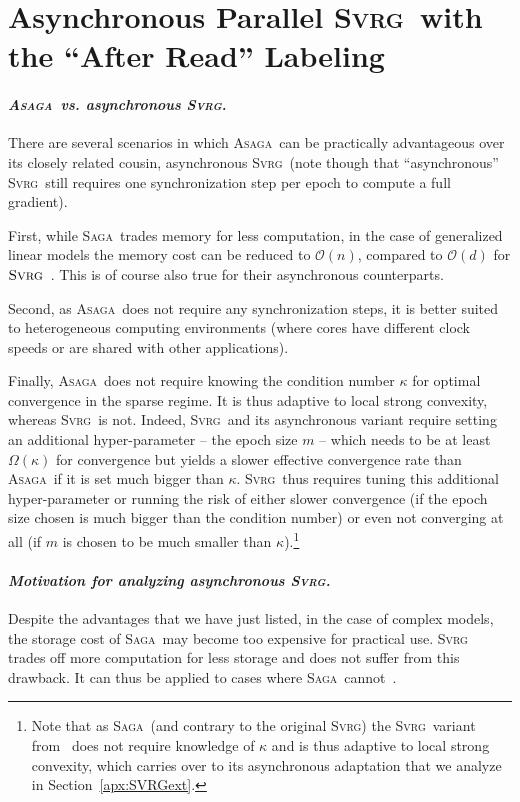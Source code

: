 \documentclass[twoside, 11pt]{article}
\newcommand{\ASAGA}{\textsc{Asaga}}
\newcommand{\SAGA}{\textsc{Saga}}
\newcommand{\SVRG}{\textsc{Svrg}}
\begin{document}
\section{Asynchronous Parallel \SVRG\ with the ``After Read'' Labeling}\label{svrg}
\paragraph{\textit{\ASAGA\ vs. asynchronous \SVRG.}}
There are several scenarios in which \ASAGA\ can be practically advantageous over its closely related cousin, asynchronous \SVRG\ (note though that ``asynchronous'' \SVRG\ still requires one synchronization step per epoch to compute a full gradient).

First, while \SAGA\ trades memory for less computation, in the case of generalized linear models the memory cost can be reduced to $\mathcal{O}(n)$, compared to $\mathcal{O}(d)$ for $\SVRG$~\citep{svrg}.
This is of course also true for their asynchronous counterparts.

Second, as \ASAGA\ does not require any synchronization steps, it is better suited to heterogeneous computing environments (where cores have different clock speeds or are shared with other applications).

Finally, \ASAGA\ does not require knowing the condition number $\kappa$ for optimal convergence in the sparse regime.
It is thus adaptive to local strong convexity, whereas \SVRG\ is not.
Indeed, \SVRG\ and its asynchronous variant require setting an additional hyper-parameter -- the epoch size $m$ -- which needs to be at least $\Omega(\kappa)$ for convergence but yields a slower effective convergence rate than \ASAGA\ if it is set much bigger than $\kappa$.
\SVRG\ thus requires tuning this additional hyper-parameter or running the risk of either slower convergence (if the epoch size chosen is much bigger than the condition number) or even not converging at all (if $m$ is chosen to be much smaller than $\kappa$).\footnote{Note that as \SAGA\ (and contrary to the original \SVRG) the \SVRG\ variant from~\citet{qsaga} does not require knowledge of $\kappa$ and is thus adaptive to local strong convexity, which carries over to its asynchronous adaptation that we analyze in Section~\ref{apx:SVRGext}.}

\paragraph{\textit{Motivation for analyzing asynchronous \SVRG.}}
Despite the advantages that we have just listed, in the case of complex models, the storage cost of \SAGA\ may become too expensive for practical use.
\SVRG~\citep{svrg} trades off more computation for less storage and does not suffer from this drawback. It can thus be applied to cases where \SAGA\ cannot~\citep[e.g. deep learning models, see][]{nonconvex}.
\end{document}
